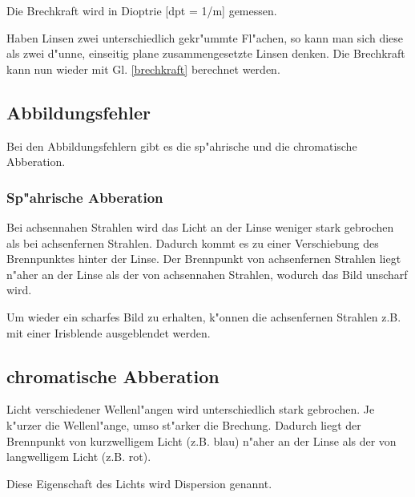 	Die Brechkraft wird in Dioptrie [dpt = 1/m] gemessen.

	Haben Linsen zwei unterschiedlich gekr"ummte Fl"achen, so kann man sich diese als zwei d"unne, einseitig plane zusammengesetzte Linsen denken.
	Die Brechkraft kann nun wieder mit Gl. \eqref{brechkraft} berechnet werden.

	\subsection{Abbildungsfehler} %
	\label{sub:abbildungsfehler}

	Bei den Abbildungsfehlern gibt es die sp"ahrische und die chromatische Abberation.
	
	\subsubsection{Sp"ahrische Abberation} %
 	\label{sub:sp_ahrische_abberation}
 
  	Bei achsennahen Strahlen wird das Licht an der Linse weniger stark gebrochen als bei achsenfernen Strahlen.
  	Dadurch kommt es zu einer Verschiebung des Brennpunktes hinter der Linse.
  	Der Brennpunkt von achsenfernen Strahlen liegt n"aher an der Linse als der von achsennahen Strahlen, wodurch das Bild unscharf wird.

   Um wieder ein scharfes Bild zu erhalten, k"onnen die achsenfernen Strahlen z.B. mit einer Irisblende ausgeblendet werden.

   \subsection{chromatische Abberation} %
   \label{sub:chromatische_abberation}
   
   Licht verschiedener Wellenl"angen wird unterschiedlich stark gebrochen.
   Je k"urzer die Wellenl"ange, umso st"arker die Brechung.
   Dadurch liegt der Brennpunkt von kurzwelligem Licht (z.B. blau) n"aher an der Linse als der von langwelligem Licht (z.B. rot).

   Diese Eigenschaft des Lichts wird Dispersion genannt.
